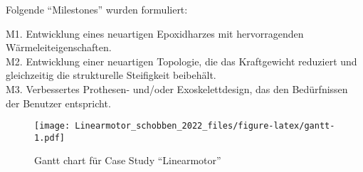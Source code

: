 \documentclass[
  oneside]{book}
\begin{document}
Folgende ``Milestones'' wurden formuliert:

M1. Entwicklung eines neuartigen Epoxidharzes mit hervorragenden Wärmeleiteigenschaften.\\
M2. Entwicklung einer neuartigen Topologie, die das Kraftgewicht reduziert und gleichzeitig die strukturelle Steifigkeit beibehält.\\
M3. Verbessertes Prothesen- und/oder Exoskelettdesign, das den Bedürfnissen der Benutzer entspricht.

\begin{figure}
\centering
\texttt{[image: Linearmotor\_schobben\_2022\_files/figure-latex/gantt-1.pdf]}
\caption{\label{fig:gantt}Gantt chart für Case Study ``Linearmotor''}
\end{figure}

  
\end{document}
